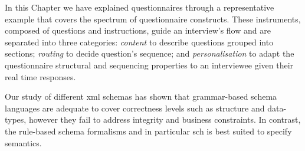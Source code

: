 	In this Chapter we have explained questionnaires through a representative example that covers the spectrum of questionnaire constructs. These instruments, composed of questions and instructions, guide an interview's flow and are separated into three categories: \emph{content} to describe questions grouped into sections; \emph{routing} to decide question's sequence; and \emph{personalisation} to adapt the questionnaire structural and sequencing properties to an interviewee given their real time responses.

	Our study of different \gls{xml} schemas has shown that grammar-based schema languages are adequate to cover correctness levels such as structure and data-types, however they fail to address integrity and business constraints. In contrast, the rule-based schema formalisms and in particular \gls{sch} is best suited to specify semantics. %
